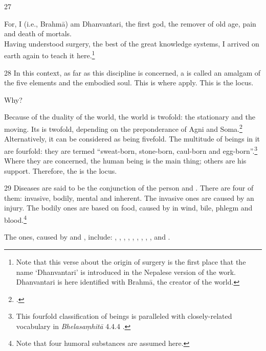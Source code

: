 \begin{translation}
    \item[27]           
    \begin{sloka}
        For, I (i.e., Brahmā) am Dhanvantari, the first god, the remover
of old age, pain and death of mortals.\\ Having understood
surgery, the best of the great knowledge systems, I arrived on
earth again to teach it here.\footnote{Note that this verse about
    the origin of surgery is the first place that the name
    `Dhanvantari' is introduced in the Nepalese version of the work. Dhanvantari 
    is here identified with Brahmā, the creator of the world.}
    \end{sloka}    
    
    
    \item[28] In this context, as far as this discipline is concerned, a 
     is called an amalgam of the five elements 
    and the embodied soul.  This is where  apply. This 
    is the locus. 
    
    Why?
    
    Because of the duality of the world, the world is twofold: the stationary
    and the moving. Its  is twofold, depending on the
    preponderance of Agni and Soma.\footcite[See][]{wuja-2004}  Alternatively,
    it can be considered as being fivefold.  The multitude of beings in it are
    fourfold: they are termed “sweat-born, stone-born, caul-born and
    egg-born”.\footnote{This fourfold classification of beings is paralleled
    with closely-related vocabulary in  \emph{Bhelasaṃhitā} 4.4.4	
    \parencites[206]{kris-2000}[81]{mook-1921}.}  Where they are concerned, the
    human being is the main thing; others are his support.  Therefore, the
     is the locus.
    
    \item[29]  Diseases are said to be the conjunction of the person and 
    .
    There are four of them: invasive, bodily, mental and inherent.  The invasive ones 
    are caused by an injury.  The bodily ones are based on food, caused by 
     in wind, bile, phlegm and blood.\footnote{Note 
    that four humoral substances are assumed here.} 
    
    The  ones, caused by 
     and 
    , 
    include:  
    , 
    , 
    , 
    , 
    , 
    ,
    ,
    ,
    , 
    and
    .
    

\end{translation}

